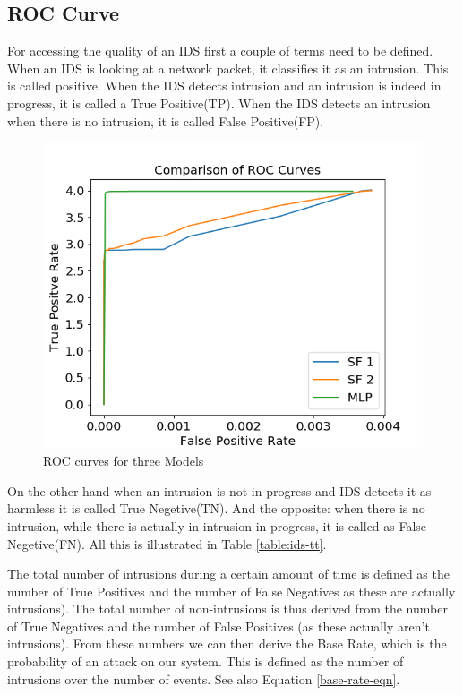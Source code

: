 \documentclass[12pt]{article}
\theoremstyle{definition}
\begin{document}
		\subsection{ROC Curve}
		For accessing the quality of an IDS first a couple of terms need to be defined. When an IDS is looking at a network packet, it classifies it as an intrusion. This is called positive. When the IDS detects intrusion and an intrusion is indeed in progress, it is called a True Positive(TP). When the IDS detects an intrusion when there is no intrusion, it is called False Positive(FP).
		\begin{figure}[!h]
			\centering
			\includegraphics[width=400pt]{pictures/allroc.png}
			\caption{ROC curves for three Models}
			\label{fig:all-roc}
		\end{figure}
		On the other hand when an intrusion is not in progress and IDS detects it as harmless it is called True Negetive(TN). And the opposite: when there is no intrusion, while there is actually in intrusion in progress, it is called as False Negetive(FN). All this is illustrated in Table \ref{table:ids-tt}.
		
		The total number of intrusions during a certain amount of time is defined as the number of True Positives and the number of False Negatives as these are actually intrusions). The total number of non-intrusions is thus derived from the number of True Negatives and the number of False Positives (as these actually aren’t intrusions). From these numbers we can then derive the Base Rate, which is the probability of an attack on our
		system. This is defined as the number of intrusions over the number of events. See also Equation \ref{base-rate-eqn}.
		
\end{document}
